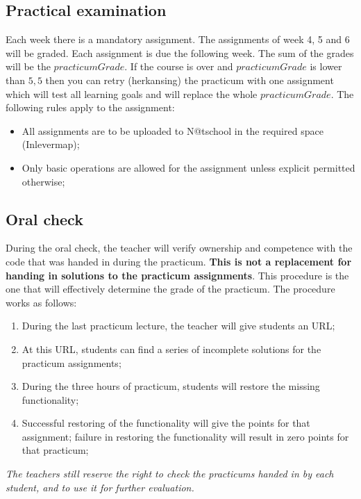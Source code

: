 \subsection{Practical examination \modulecode}
Each week there is a mandatory assignment. The assignments of week 4, 5 and 6 will be graded. Each assignment is due the following week. The sum of the grades will be the $practicumGrade$. 
If the course is over and $practicumGrade$ is lower than $5,5$ then you can retry (herkansing) the practicum with one assignment which will test all learning goals and will replace the whole $practicumGrade$.
The following rules apply to the assignment:
\begin{itemize}
  \item All assignments are to be uploaded to N@tschool in the required space (Inlevermap);
  \item Only basic operations are allowed for the assignment unless explicit permitted otherwise; 
\end{itemize}



\subsection{Oral check \modulecode}
During the oral check, the teacher will verify ownership and competence with the code that was handed in during the practicum. \textbf{This is not a replacement for handing in solutions to the practicum assignments}. This procedure is the one that will effectively determine the grade of the practicum. The procedure works as follows:

\begin{enumerate}
\item During the last practicum lecture, the teacher will give students an URL;
\item At this URL, students can find a series of incomplete solutions for the practicum assignments;
\item During the three hours of practicum, students will restore the missing functionality;
\item Successful restoring of the functionality will give the points for that assignment; failure in restoring the functionality will result in zero points for that practicum;
\end{enumerate}

\textit{The teachers still reserve the right to check the practicums handed in by each student, and to use it for further evaluation.}
